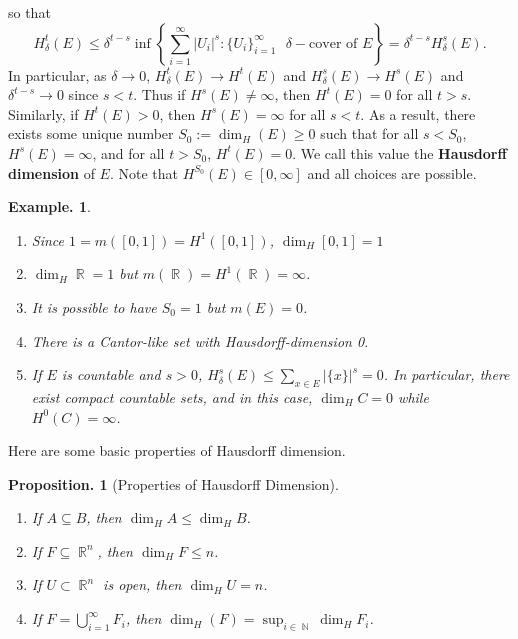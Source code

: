 \documentclass[11pt, a4paper]{memoir}
\DeclareMathOperator{\N}{{\mathbb{N}}}
\DeclareMathOperator{\R}{{\mathbb{R}}}
\theoremstyle{change}
\newtheorem{proposition}[theorem]{Proposition.}
\theoremstyle{plain}
\theoremstyle{nonumberplain}
\newtheorem{example}{Example.}
\newcommand{\defn}[1]{{\boldmath\bfseries #1}}
\numberwithin{equation}{section}
\begin{document}
so that
\begin{equation*}
    H_\delta^t(E)\leq\delta^{t-s}\inf\left\{\sum_{i=1}^\infty|U_i|^s:\{U_i\}_{i=1}^\infty\text{ $\delta-$cover of }E\right\}=\delta^{t-s}H_\delta^s(E).
\end{equation*}
In particular, as $\delta\to 0$, $H_\delta^t(E)\to H^t(E)$ and $H_\delta^s(E)\to H^s(E)$ and $\delta^{t-s}\to 0$ since $s<t$.
Thus if $H^s(E)\neq\infty$, then $H^t(E)=0$ for all $t>s$.
Similarly, if $H^t(E)>0$, then $H^s(E)=\infty$ for all $s<t$.
As a result, there exists some unique number $S_0:=\dim_H(E)\geq 0$ such that for all $s<S_0$, $H^s(E)=\infty$, and for all $t>S_0$, $H^t(E)=0$.
We call this value the \defn{Hausdorff dimension} of $E$.
Note that $H^{S_0}(E)\in[0,\infty]$ and all choices are possible.
\begin{example}
    \begin{enumerate}[nl,r]
        \item Since $1=m([0,1])=H^1([0,1])$, $\dim_H[0,1]=1$
        \item $\dim_H\R=1$ but $m(\R)=H^1(\R)=\infty$.
        \item It is possible to have $S_0=1$ but $m(E)=0$.
        \item There is a Cantor-like set with Hausdorff-dimension 0.
        \item If $E$ is countable and $s>0$, $H^s_\delta(E)\leq\sum_{x\in E}|\{x\}|^s=0$.
            In particular, there exist compact countable sets, and in this case, $\dim_H C=0$ while $H^0(C)=\infty$.
    \end{enumerate}
\end{example}
Here are some basic properties of Hausdorff dimension.
\begin{proposition}[Properties of Hausdorff Dimension]
    \begin{enumerate}[nl,r]
        \item If $A\subseteq B$, then $\dim_HA\leq\dim_HB$.
        \item If $F\subseteq\R^n$, then $\dim_H F\leq n$.
        \item If $U\subset\R^n$ is open, then $\dim_H U=n$.
        \item If $F=\bigcup_{i=1}^\infty F_i$, then $\dim_H(F)=\sup_{i\in\N}\dim_H F_i$.
    \end{enumerate}
\end{proposition}
\end{document}

